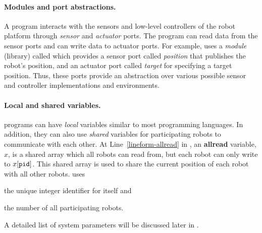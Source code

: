 \paragraph{Modules and port abstractions.}
A \lgname program interacts with the sensors and low-level controllers of the robot platform through \emph{sensor} and \emph{actuator} ports.
%
%
The program can read data from the sensor ports and can write data to actuator ports.
%
For example, \LineForm uses a \emph{module} (library) called \Motion which provides a sensor port called \emph{position} that publishes the robot's position, and an actuator port called \emph{target} for specifying a target position.
%
Thus, these  ports provide an abstraction over various possible sensor and controller implementations and environments.
%


%
%

\paragraph{Local and shared variables.}
\lgname programs can have  \emph{local} variables similar to most programming languages.
In addition, they can also use \emph{shared} variables for participating robots to communicate with each other.
At Line~\ref{lineform-allread} in ,
an \textbf{allread} variable, $x$, is a shared array which all robots can read from,
but each robot \myuin can only write to $x[\texttt{pid}]$.
This shared array is used to share the current position of each robot with all other robots.
\LineForm uses
\begin{inparaenum}[(a)]
    \item the unique integer identifier \myuin for itself and
    \item the number \NMAX of all participating robots.
\end{inparaenum}
A detailed list of system parameters will be discussed later in .

